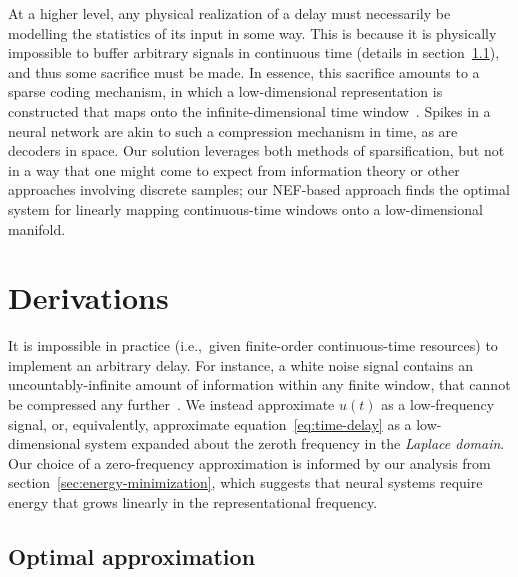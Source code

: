 At a higher level, any physical realization of a delay must necessarily be modelling the statistics of its input in some way.
This is because it is physically impossible to buffer arbitrary signals in continuous time (details in section~\ref{sec:nef-delay}), and thus some sacrifice must be made.
In essence, this sacrifice amounts to a sparse coding mechanism, in which a low-dimensional representation is constructed that maps onto the infinite-dimensional time window~\citep{blumensath2009sampling}.
Spikes in a neural network are akin to such a compression mechanism in time, as are decoders in space.
Our solution leverages both methods of sparsification, but not in a way that one might come to expect from information theory or other approaches involving discrete samples; our NEF-based approach finds the optimal system for linearly mapping continuous-time windows onto a low-dimensional manifold.

\section{Derivations}
\label{sec:derivations}

It is impossible in practice (i.e.,~given finite-order continuous-time resources) to implement an arbitrary delay.
For instance, a white noise signal contains an uncountably-infinite amount of information within any finite window, that cannot be compressed any further~\citep{cover2012elements}.
We instead approximate $u(t)$ as a low-frequency signal, or, equivalently, approximate equation~\ref{eq:time-delay} as a low-dimensional system expanded about the zeroth frequency in the \emph{Laplace domain}.
Our choice of a zero-frequency approximation is informed by our analysis from section~\ref{sec:energy-minimization}, which suggests that neural systems require energy that grows linearly in the representational frequency.

\subsection{Optimal approximation}
\label{sec:nef-delay}

